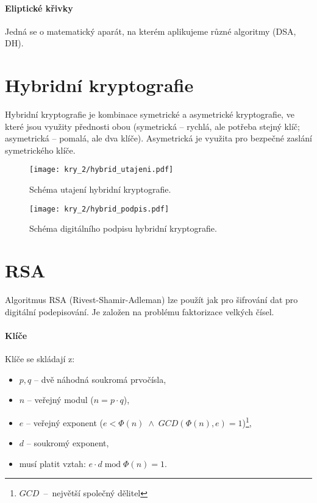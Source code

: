 \paragraph*{Eliptické křivky} Jedná se o matematický aparát, na kterém aplikujeme různé algoritmy (DSA, DH).


\section{Hybridní kryptografie}

Hybridní kryptografie je kombinace symetrické a asymetrické kryptografie, ve které jsou využity přednosti obou (symetrická -- rychlá, ale potřeba stejný klíč; asymetrická -- pomalá, ale dva klíče). Asymetrická je využita pro bezpečné zaslání symetrického klíče.

\begin{figure}[H]
    \centering
    \texttt{[image: kry\_2/hybrid\_utajeni.pdf]}
    \caption{Schéma utajení hybridní kryptografie.}
\end{figure}

\begin{figure}[H]
    \centering
    \texttt{[image: kry\_2/hybrid\_podpis.pdf]}
    \caption{Schéma digitálního podpisu hybridní kryptografie.}
\end{figure}


\section{RSA}

Algoritmus RSA (Rivest-Shamir-Adleman) lze použít jak pro šifrování dat pro digitální podepisování. Je založen na problému faktorizace velkých čísel.

\paragraph*{Klíče} Klíče se skládají z: \begin{itemize}
    \item $p, q$ -- dvě náhodná soukromá prvočísla,
    \item $n$ -- veřejný modul ($n = p \cdot q$),
    \item $e$ -- veřejný exponent ($e < \Phi(n) \; \land \; GCD(\Phi(n), e) = 1$)\footnote{$GCD$~--~největší společný dělitel},
    \item $d$ -- soukromý exponent,
    \item musí platit vztah: $e \cdot d \; \text{mod} \; \Phi(n) = 1$.
\end{itemize}

